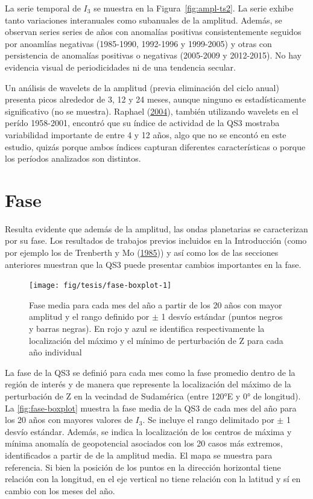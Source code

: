 \documentclass[spanish,a4paper,12pt,oneside]{book}
\begin{document}
La serie temporal de \(I_3\) se muestra en la Figura~\ref{fig:ampl-ts2}.
La serie exhibe tanto variaciones interanuales como subanuales de la
amplitud. Además, se observan series series de años con anomalías
positivas consistentemente seguidos por anoamlías negativas (1985-1990,
1992-1996 y 1999-2005) y otras con persistencia de anomalías positivas o
negativas (2005-2009 y 2012-2015). No hay evidencia visual de
periodicidades ni de una tendencia secular.

Un análisis de wavelets de la amplitud (previa eliminación del ciclo
anual) presenta picos alrededor de 3, 12 y 24 meses, aunque ninguno es
estadísticamente significativo (no se muestra). Raphael
(\protect\hyperlink{ref-Raphael2004}{2004}), también utilizando wavelets
en el perído 1958-2001, encontró que su índice de actividad de la QS3
mostraba variabilidad importante de entre 4 y 12 años, algo que no se
encontó en este estudio, quizás porque ambos índices capturan diferentes
características o porque los períodos analizados son distintos.

\section{Fase}\label{fase}

Resulta evidente que además de la amplitud, las ondas planetarias se
caracterizan por su fase. Los resultados de trabajos previos incluidos
en la Introducción (como por ejemplo los de Trenberth y Mo
(\protect\hyperlink{ref-Trenberth1985}{1985})) y así como los de las
secciones anteriores muestran que la QS3 puede presentar cambios
importantes en la fase.

\begin{landscape}\begin{figure}

{\centering \texttt{[image: fig/tesis/fase-boxplot-1]} 

}

\caption{Fase media para cada mes del año a partir de los 20 años con mayor amplitud y el rango definido por $\pm$ 1 desvío estándar  (puntos negros y barras negras). En rojo y azul se identifica respectivamente la localización del máximo y el mínimo de perturbación de Z para cada año individual}\label{fig:fase-boxplot}
\end{figure}
\end{landscape}

La fase de la QS3 se definió para cada mes como la fase promedio dentro
de la región de interés y de manera que represente la localización del
máximo de la perturbación de Z en la vecindad de Sudamérica (entre 120°E
y 0° de longitud). La \autoref{fig:fase-boxplot} muestra la fase media
de la QS3 de cada mes del año para los 20 años con mayores valores de
\(I_3\). Se incluye el rango delimitado por \(\pm\) 1 desvío estándar.
Además, se indica la localización de los centros de máxima y mínima
anomalía de geopotencial asociados con los 20 casos más extremos,
identificados a partir de de la amplitud media. El mapa se muestra para
referencia. Si bien la posición de los puntos en la dirección horizontal
tiene relación con la longitud, en el eje vertical no tiene relación con
la latitud y sí en cambio con los meses del año.
\end{document}

